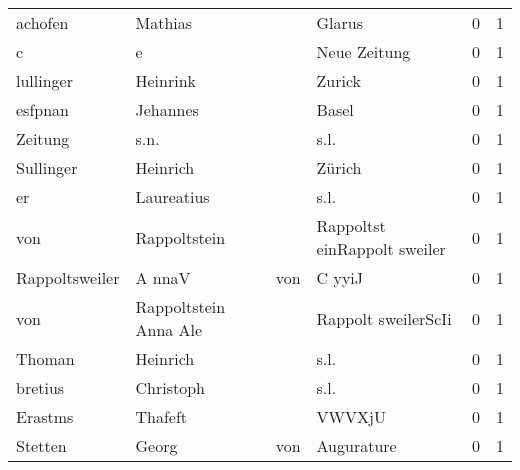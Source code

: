 \begin{center}
\begin{tiny}
\begin{longtabu}{llllrr}
                  achofen &                            Mathias &             &                                      Glarus &          0 &         1 \\
                        c &                                  e &             &                                Neue Zeitung &          0 &         1 \\
                lullinger &                           Heinrink &             &                                      Zurick &          0 &         1 \\
                  esfpnan &                           Jehannes &             &                                       Basel &          0 &         1 \\
                  Zeitung &                               s.n. &             &                                        s.l. &          0 &         1 \\
                Sullinger &                           Heinrich &             &                                      Zürich &          0 &         1 \\
                       er &                         Laureatius &             &                                        s.l. &          0 &         1 \\
                      von &                       Rappoltstein &             &                Rappoltst einRappolt sweiler &          0 &         1 \\
           Rappoltsweiler &                             A nnaV &         von &                                      C yyiJ &          0 &         1 \\
                      von &              Rappoltstein Anna Ale &             &                         Rappolt sweilerScIi &          0 &         1 \\
                   Thoman &                           Heinrich &             &                                        s.l. &          0 &         1 \\
                  bretius &                          Christoph &             &                                        s.l. &          0 &         1 \\
                  Erastms &                            Thafeft &             &                                      VWVXjU &          0 &         1 \\
                  Stetten &                              Georg &         von &                                  Augurature &          0 &         1 \\

\end{longtabu}
\end{tiny}
\end{center}
